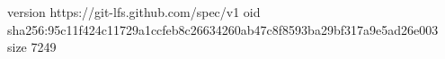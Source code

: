 version https://git-lfs.github.com/spec/v1
oid sha256:95c11f424c11729a1ccfeb8c26634260ab47c8f8593ba29bf317a9e5ad26e003
size 7249
